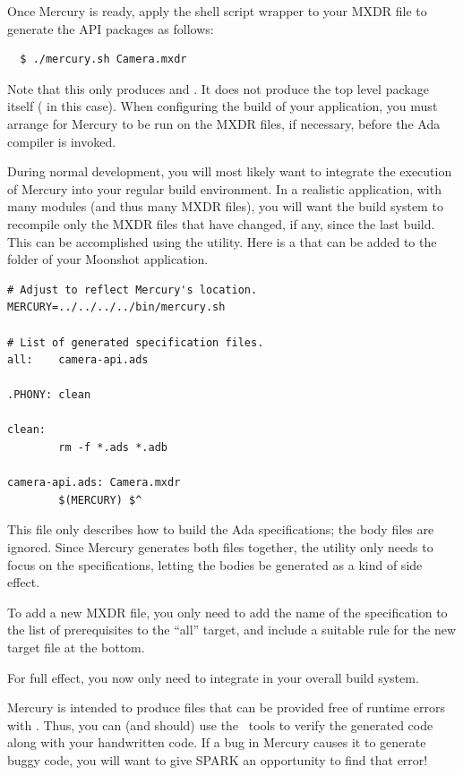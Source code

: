 Once Mercury is ready, apply the shell script wrapper to your MXDR file to generate the API
packages as follows:

\begin{verbatim}
  $ ./mercury.sh Camera.mxdr
\end{verbatim}

Note that this only produces  and . It does
not produce the top level package itself ( in this case). When configuring
the build of your application, you must arrange for Mercury to be run on the MXDR files, if
necessary, before the Ada compiler is invoked.

During normal development, you will most likely want to integrate the execution of Mercury
into your regular build environment. In a realistic application, with many modules (and thus
many MXDR files), you will want the build system to recompile only the MXDR files that have
changed, if any, since the last build. This can be accomplished using the 
utility. Here is a  that can be added to the  folder of
your Moonshot application.

\begin{verbatim}
# Adjust to reflect Mercury's location.
MERCURY=../../../../bin/mercury.sh

# List of generated specification files.
all:	camera-api.ads

.PHONY: clean

clean:
        rm -f *.ads *.adb

camera-api.ads:	Camera.mxdr
        $(MERCURY) $^
\end{verbatim}

This file only describes how to build the Ada specifications; the body files are ignored. Since
Mercury generates both files together, the  utility only needs to focus on the
specifications, letting the bodies be generated as a kind of side effect.

To add a new MXDR file, you only need to add the name of the specification to the list of
prerequisites to the ``all'' target, and include a suitable rule for the new target file at the
bottom.

For full effect, you now only need to integrate  in your overall build system.

Mercury is intended to produce files that can be provided free of runtime errors with \SPARK.
Thus, you can (and should) use the \SPARK\ tools to verify the generated code along with your
handwritten code. If a bug in Mercury causes it to generate buggy code, you will want to give
SPARK an opportunity to find that error!

